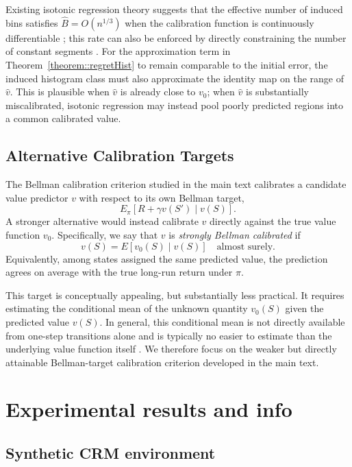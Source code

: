 \documentclass{article}
\theoremstyle{plain}
\theoremstyle{definition}
\theoremstyle{remark}
\begin{document}
Existing isotonic regression theory suggests that the effective number of
induced bins satisfies \(\widehat B=O(n^{1/3})\) when the calibration function
is continuously differentiable \citep{deng2021confidence}; this rate can also
be enforced by directly constraining the number of constant segments
\citep{van2024self}. For the approximation term in
Theorem~\ref{theorem::regretHist} to remain comparable to the initial error,
the induced histogram class must also approximate the identity map on the range
of \(\hat v\). This is plausible when \(\hat v\) is already close to \(v_0\);
when \(\hat v\) is substantially miscalibrated, isotonic regression may instead
pool poorly predicted regions into a common calibrated value.

\subsection{Alternative Calibration Targets}
\label{app:alternative-calibration-targets}

The Bellman calibration criterion studied in the main text calibrates a
candidate value predictor \(v\) with respect to its own Bellman target,
\[
E_\pi\!\left[R+\gamma v(S')\mid v(S)\right].
\]
A stronger alternative would instead calibrate \(v\) directly against the true
value function \(v_0\). Specifically, we say that \(v\) is
\emph{strongly Bellman calibrated} if
\[
v(S)
=
E\!\left[v_0(S)\mid v(S)\right]
\quad\text{almost surely}.
\]
Equivalently, among states assigned the same predicted value, the prediction
agrees on average with the true long-run return under \(\pi\).

This target is conceptually appealing, but substantially less practical. It
requires estimating the conditional mean of the unknown quantity \(v_0(S)\)
given the predicted value \(v(S)\). In general, this conditional mean is not directly
available from one-step transitions alone and is typically no easier to estimate
than the underlying value function itself
\citep{kallus2020double,kallus2022efficiently}. We therefore focus on the
weaker but directly attainable Bellman-target calibration criterion developed
in the main text.



 

\section{Experimental results and info}
\label{appendx::exp}
\subsection{Synthetic CRM environment}
 
\end{document}
